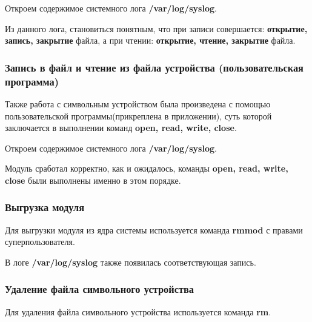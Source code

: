

\clearpage

Откроем содержимое системного лога \textbf{/var/log/syslog}.



Из данного лога, становиться понятным, что при записи совершается: \textbf{открытие, запись, закрытие} файла, а при чтении: \textbf{открытие, чтение, закрытие} файла.

\subsubsection{Запись в файл и чтение из файла устройства (пользовательская программа)}

\par Также работа с символьным устройством была произведена с помощью пользовательской программы(прикреплена в приложении), суть которой заключается в выполнении команд \textbf{open, read, write, close}.



\par Откроем содержимое системного лога \textbf{/var/log/syslog}.



\par Модуль сработал корректно, как и ожидалось, команды \textbf{open, read, write, close} были выполнены именно в этом порядке.

\subsubsection{Выгрузка модуля}

\par Для выгрузки модуля из ядра системы используется команда \textbf{rmmod} с правами суперпользователя.



\par В логе \textbf{/var/log/syslog} также появилась соответствующая запись.


\subsubsection{Удаление файла символьного устройства}
Для удаления файла символьного устройства используется команда \textbf{rm}.


